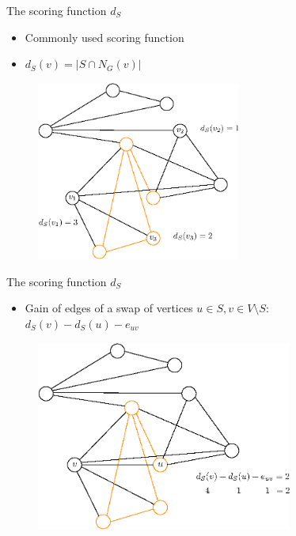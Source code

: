 \documentclass{beamer}
\begin{document}
\begin{frame}{The scoring function $d_S$}
    \begin{itemize}
        \item Commonly used scoring function
        \item $d_S(v) = | S \cap N_G(v) |$
    \end{itemize}
    \begin{figure}
        \centering
        \includegraphics[width=0.6\textwidth]{graphics/ds1.eps}
    \end{figure}
\end{frame}

\begin{frame}{The scoring function $d_S$}
    \begin{itemize}
        \item Gain of edges of a swap of vertices $u \in S, v \in V \setminus S$: \\
         $d_S(v) - d_S(u) - e_{uv}$
    \end{itemize}
    \begin{figure}
        \centering
        \includegraphics[width=0.75\textwidth]{graphics/ds1-1.eps}
    \end{figure}
\end{frame}
\end{document}
